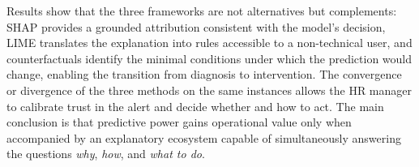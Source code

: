 Results show that the three frameworks are not alternatives but complements: SHAP provides a grounded attribution consistent with the model's decision, LIME translates the explanation into rules accessible to a non-technical user, and counterfactuals identify the minimal conditions under which the prediction would change, enabling the transition from diagnosis to intervention. The convergence or divergence of the three methods on the same instances allows the HR manager to calibrate trust in the alert and decide whether and how to act. The main conclusion is that predictive power gains operational value only when accompanied by an explanatory ecosystem capable of simultaneously answering the questions \emph{why}, \emph{how}, and \emph{what to do}.
